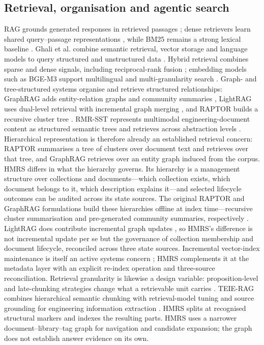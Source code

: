 \subsection{Retrieval, organisation and agentic search}
RAG grounds generated responses in retrieved passages \citep{rag-lewis}; dense
retrievers learn shared query--passage representations \citep{dpr}, while BM25
remains a strong lexical baseline \citep{bm25}. Ghali et al. combine
semantic retrieval, vector storage and language models to query structured and
unstructured data \citep{ghali-kbs-retrieval-2025}. Hybrid retrieval combines
sparse and dense signals, including reciprocal-rank fusion
\citep{rrf-cormack}; embedding models such as BGE-M3 support multilingual and
multi-granularity search \citep{bge-m3}. Graph- and tree-structured systems
organise and retrieve structured relationships: GraphRAG adds entity-relation
graphs and community summaries \citep{graphrag}, LightRAG uses dual-level
retrieval with incremental graph merging \citep{lightrag}, and RAPTOR builds a
recursive cluster tree \citep{raptor}. RMR-SST represents multimodal
engineering-document content as structured semantic trees and retrieves
across abstraction levels \citep{li-kbs-rmrsst-2026}. Hierarchical
representation is therefore already an established retrieval concern: RAPTOR summarises a tree of clusters over
document text and retrieves over that tree, and GraphRAG retrieves over an
entity graph induced from the corpus. HMRS differs in what the hierarchy
governs. Its hierarchy is a management structure over collections and
documents---which collection exists, which document belongs to it, which
description explains it---and selected lifecycle outcomes can be audited
across its state sources. The original RAPTOR and GraphRAG formulations build these hierarchies
offline at index time---recursive cluster summarisation and pre-generated
community summaries, respectively \cite{raptor,graphrag}. LightRAG
does contribute incremental graph updates \citep{lightrag}, so HMRS's
difference is not incremental update per se but the governance of collection
membership and document lifecycle, reconciled across three state sources.
Incremental vector-index maintenance is itself an
active systems concern \cite{singh2021freshdiskann,xu2023spfresh}; HMRS
complements it at the metadata layer with an explicit re-index operation and
three-source reconciliation. Retrieval granularity is likewise a design
variable: proposition-level and late-chunking strategies change what a
retrievable unit carries \cite{chen2024dense,gunther2024late}. TEIE-RAG
combines hierarchical semantic chunking with retrieval-model tuning and source
grounding for engineering information extraction \citep{shen-kbs-teierag-2026}.
HMRS splits at recognised structural markers and indexes the resulting parts.
HMRS uses a
narrower document--library--tag graph for navigation and candidate
expansion; the graph does not establish answer evidence on its own.

